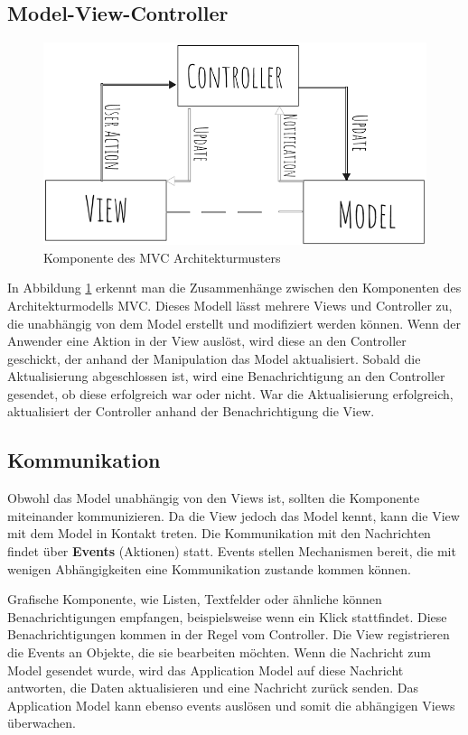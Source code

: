 \subsection*{Model-View-Controller}
\begin{figure}[H] 
\centering
\includegraphics[scale=0.4]{fig/mvc.png} 
\caption{Komponente des MVC Architekturmusters}
\label{fig:MVC}
\end{figure} 
In Abbildung \ref{fig:MVC} erkennt man die Zusammenh\"ange zwischen den Komponenten des Architekturmodells \ac{MVC}. Dieses Modell l\"asst mehrere Views und Controller zu, die unabh\"angig von dem Model erstellt und modifiziert werden k\"onnen\cite{Curry2008}.
Wenn der Anwender eine Aktion in der View ausl\"ost, wird diese an den Controller geschickt, der anhand der Manipulation das Model aktualisiert. Sobald die Aktualisierung abgeschlossen ist, wird eine Benachrichtigung an den Controller gesendet, ob diese erfolgreich war oder nicht. War die Aktualisierung erfolgreich, aktualisiert der Controller anhand der Benachrichtigung die View.
\subsection*{Kommunikation}
Obwohl das Model unabh\"angig von den Views ist, sollten die Komponente miteinander kommunizieren. Da die View jedoch das Model kennt, kann die View mit dem Model in Kontakt treten. Die Kommunikation mit den Nachrichten findet \"uber \textbf{Events} (Aktionen) statt. Events stellen Mechanismen bereit, die mit wenigen Abh\"angigkeiten eine Kommunikation zustande kommen k\"onnen.\par\smallskip 
Grafische Komponente, wie Listen, Textfelder oder \"ahnliche k\"onnen Benachrichtigungen empfangen, beispielsweise wenn ein Klick stattfindet. Diese Benachrichtigungen kommen in der Regel vom Controller. Die View registrieren die Events an Objekte, die sie bearbeiten m\"ochten. Wenn die Nachricht zum Model gesendet wurde, wird das Application Model auf diese Nachricht antworten, die Daten aktualisieren und eine Nachricht zur\"uck senden. Das Application Model kann ebenso events ausl\"osen und somit die abh\"angigen Views \"uberwachen\cite{Deacon2005}. 

